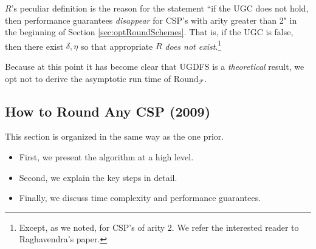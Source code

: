 \documentclass[letterpaper, 12pt]{article}
\numberwithin{equation}{section}
\begin{document}
$R$'s peculiar definition is the reason for the statement ``if the UGC does not hold, then performance guarantees \textit{disappear} for CSP's with arity greater than 2" in the beginning of Section \ref{sec:optRoundSchemes}. That is, if the UGC is false, then there exist $\delta,\eta$ so that appropriate $R$ \textit{does not exist}.\footnote{Except, as we noted, for CSP's of arity 2. We refer the interested reader to Raghavendra's paper.} 

Because at this point it has become clear that UGDFS is a \textit{theoretical} result, we opt not to derive the asymptotic run time of $\text{Round}_{\mathcal{F}}$.

\subsection{How to Round Any CSP (2009)}
This section is organized in the same way as the one prior.
\begin{itemize}
\item First, we present the algorithm at a high level.
\item Second, we explain the key steps in detail.
\item Finally, we discuss time complexity and performance guarantees.
\end{itemize}
\end{document}
